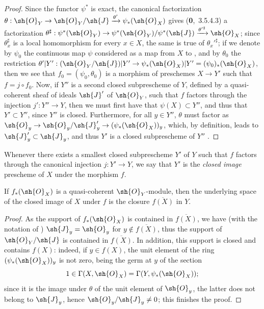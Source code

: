 \begin{proof}
Since the functor $\psi^*$ is exact, the canonical factorization
$\theta:\sh{O}_Y\to\sh{O}_Y/\sh{J}\xrightarrow{\theta'}\psi_*(\sh{O}_X)$ gives (\textbf{0},~3.5.4.3)
a factorization
$\theta^\sharp:\psi^*(\sh{O}_Y)\to\psi^*(\sh{O}_Y)/\psi^*(\sh{J})
  \xrightarrow{{\theta'}^\sharp}\sh{O}_X$; since $\theta_x^\sharp$ is a local homomorphism for
every $x\in X$, the same is true of ${\theta_x'}^\sharp$; if we denote by $\psi_0$ the
continuous map $\psi$ considered as a map from $X$ to , and by $\theta_0$ the restriction
$\theta'|Y':(\sh{O}_Y/\sh{J})|Y'\to\psi_*(\sh{O}_X)|Y'=(\psi_0)_*(\sh{O}_X)$, then we see that
$f_0=(\psi_0,\theta_0)$ is a morphism of preschemes $X\to Y'$  such that
$f=j\circ f_0$. Now, if $Y''$
is a second closed subprescheme of $Y$, defined by a quasi-coherent sheaf of ideals $\sh{J}'$ of
$\sh{O}_Y$, such that $f$ factors through the injection $j':Y''\to Y$, then we must
first have that $\psi(X)\subset Y''$, and thus that $Y'\subset Y''$, since $Y''$ is closed.
Furthermore, for all $y\in Y''$, $\theta$ must factor as
$\sh{O}_y\to\sh{O}_y/\sh{J}'_y\to(\psi_*(\sh{O}_X))_y$, which, by definition, leads to
$\sh{J}'_y\subset\sh{J}_y$, and thus $Y'$ is a closed subprescheme of $Y''$
.
\end{proof}

\begin{definition}[9.5.3]
\label{I.9.5.3}
Whenever there exists a smallest closed subprescheme $Y'$ of $Y$ such that $f$ factors
through the canonical injection $j:Y'\to Y$, we say that $Y'$ is the
\emph{closed image} prescheme of $X$ under the morphism $f$.
\end{definition}

\begin{proposition}[9.5.4]
\label{I.9.5.4}
If $f_*(\sh{O}_X)$ is a quasi-coherent $\sh{O}_Y$-module, then the underlying space of
the closed image of $X$ under $f$ is the closure $\overline{f(X)}$ in $Y$.
\end{proposition}

\begin{proof}
As the support of $f_*(\sh{O}_X)$ is contained in $\overline{f(X)}$, we have (with
the notation of ) $\sh{J}_y=\sh{O}_y$ for
$y\not\in\overline{f(X)}$, thus the support of $\sh{O}_Y/\sh{J}$ is contained in
$\overline{f(X)}$. In addition, this support is closed and contains $f(X)$:
indeed, if $y\in f(X)$, the unit element of the ring $(\psi_*(\sh{O}_X))_y$ is not
zero, being the germ at $y$ of the section
\[
  1\in\Gamma(X,\sh{O}_X)=\Gamma(Y,\psi_*(\sh{O}_X));
\]
since it is the image under $\theta$ of the unit element of $\sh{O}_y$, the latter
does not belong to $\sh{J}_y$, hence $\sh{O}_y/\sh{J}_y\neq 0$; this finishes the
proof.
\end{proof}

